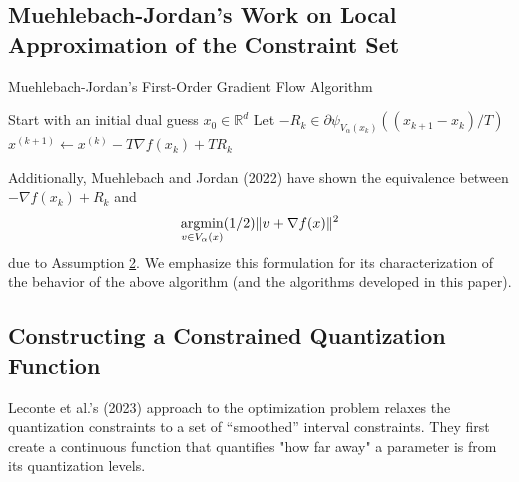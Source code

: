 \documentclass[10pt,a4paper]{article}
\begin{document}
\subsection{Muehlebach-Jordan's Work on Local Approximation of the Constraint Set} \phantom{}



\begin{algorithm}
    \caption{Muehlebach-Jordan's First-Order Gradient Flow Algorithm}\label{alg:cap}
    \begin{algorithmic}[1]
        \State Start with an initial dual guess $x_0\in\mathbb{R}^d$
        \State Let $-R_k\in\partial \psi_{V_\alpha(x_k)}((x_{k+1}-x_k)/T)$
        \State $x^{(k+1)}\gets x^{(k)}-T\nabla f(x_k)+TR_k$
        \EndFor
    \end{algorithmic}
\end{algorithm}

Additionally, Muehlebach and Jordan (2022) have shown the equivalence between $-\nabla f(x_k)+R_k$ and \begin{equation}\label{speed}\mathop{\mathrm{argmin}}_{v\in V_\alpha(x)}(1/2)\lVert v+\nabla f(x)\rVert^2\end{equation} due to Assumption \hyperref[ass2]{2}. We emphasize this formulation for its characterization of the behavior of the above algorithm (and the algorithms developed in this paper).

\subsection{Constructing a Constrained Quantization Function} \phantom{}

Leconte et al.'s (2023) approach to the optimization problem relaxes the quantization constraints to a set of ``smoothed'' interval constraints. They first create a continuous function that quantifies "how far away" a parameter is from its quantization levels.

\end{document}
